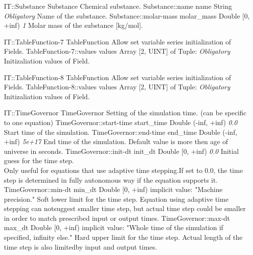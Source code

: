 \begin{RecordType}
	{IT::Substance}
	{Substance}
	{} %
	{} %
	{{{Chemical substance.}}}
		\RecKey
			{Substance::name}
			{name}
			{{String}}
			{ \it{Obligatory} }
			{{{Name of the substance.}}}
		\RecKey
			{Substance::molar-mass}
			{molar{\_}mass}
			{{Double [0, +inf)}}
			{ \it{1} }
			{{{Molar mass of the substance [kg/mol].}}}
\end{RecordType}
\begin{RecordType}
	{IT::TableFunction-7}
	{TableFunction}
	{} %
	{} %
	{{{Allow set variable series initialization of Fields.}}}
		\RecKey
			{TableFunction-7::values}
			{values}
			{{Array [2, UINT] of }{Tuple}{: }}
			{ \it{Obligatory} }
			{{{Initizaliation values of Field.}}}
\end{RecordType}
\begin{RecordType}
	{IT::TableFunction-8}
	{TableFunction}
	{} %
	{} %
	{{{Allow set variable series initialization of Fields.}}}
		\RecKey
			{TableFunction-8::values}
			{values}
			{{Array [2, UINT] of }{Tuple}{: }}
			{ \it{Obligatory} }
			{{{Initizaliation values of Field.}}}
\end{RecordType}
\begin{RecordType}
	{IT::TimeGovernor}
	{TimeGovernor}
	{} %
	{} %
	{{{Setting of the simulation time. (can be specific to one equation)}}}
		\RecKey
			{TimeGovernor::start-time}
			{start{\_}time}
			{{Double (-inf, +inf)}}
			{ \it{0.0} }
			{{{Start time of the simulation.}}}
		\RecKey
			{TimeGovernor::end-time}
			{end{\_}time}
			{{Double (-inf, +inf)}}
			{ \it{5e+17} }
			{{{End time of the simulation. Default value is more then age of universe in seconds.}}}
		\RecKey
			{TimeGovernor::init-dt}
			{init{\_}dt}
			{{Double [0, +inf)}}
			{ \it{0.0} }
			{{{Initial guess for the time step.}\\{
Only useful for equations that use adaptive time stepping.If set to 0.0, the time step is determined in fully autonomous way if the equation supports it.}}}
		\RecKey
			{TimeGovernor::min-dt}
			{min{\_}dt}
			{{Double [0, +inf)}}
			{implicit value: "{Machine precision.}"}
			{{{Soft lower limit for the time step. Equation using adaptive time stepping can notsuggest smaller time step, but actual time step could be smaller in order to match prescribed input or output times.}}}
		\RecKey
			{TimeGovernor::max-dt}
			{max{\_}dt}
			{{Double [0, +inf)}}
			{implicit value: "{Whole time of the simulation if specified, infinity else.}"}
			{{{Hard upper limit for the time step. Actual length of the time step is also limitedby input and output times.}}}
\end{RecordType}
